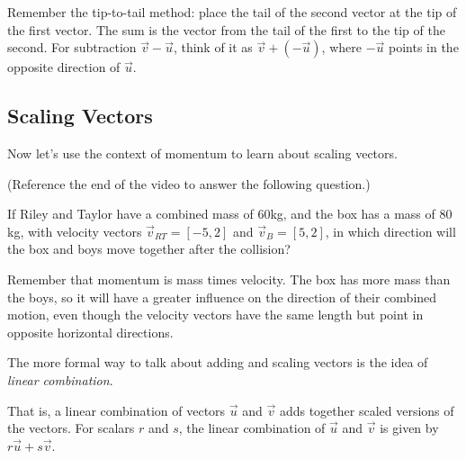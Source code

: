 \documentclass{ximera}
\begin{document}
\begin{problem}
    \begin{feedback}
        Remember the tip-to-tail method: place the tail of the second vector at the tip of the first vector. The sum is the vector from the tail of the first to the tip of the second. For subtraction $\vec{v}-\vec{u}$, think of it as $\vec{v}+(-\vec{u})$, where $-\vec{u}$ points in the opposite direction of $\vec{u}$.
    \end{feedback}
\end{problem}

\subsection*{Scaling Vectors}

Now let's use the context of momentum to learn about scaling vectors.


\begin{problem}
    (Reference the end of the video to answer the following question.)
    
    If Riley and Taylor have a combined mass of $60$kg, and the box has a mass of $80$kg, with velocity vectors $\vec{v}_{RT}=[-5,2]$ and $\vec{v}_B=[5,2]$, in which direction will the box and boys move together after the collision?
    \begin{multipleChoice}
    \end{multipleChoice}
    \begin{feedback}
        Remember that momentum is mass times velocity. The box has more mass than the boys, so it will have a greater influence on the direction of their combined motion, even though the velocity vectors have the same length but point in opposite horizontal directions.
    \end{feedback}
\end{problem}

\begin{definition}
The more formal way to talk about adding and scaling vectors is the idea of \emph{linear combination}. 

That is, a linear combination of vectors $\vec{u}$ and $\vec{v}$ adds together scaled versions of the vectors. For scalars $r$ and $s$, the linear combination of $\vec{u}$ and $\vec{v}$ is given by $r\vec{u}+s\vec{v}$.
\end{definition}
\end{document}
